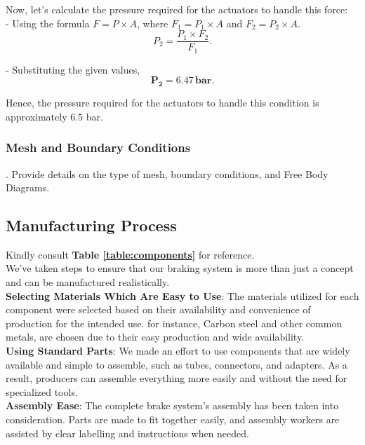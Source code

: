 Now, let's calculate the pressure required for the actuators to handle this force: \\
 
- Using the formula $F = P \times A$, where $F_1 = P_1 \times A$ and $F_2 = P_2 \times A$.\\  
\[
P_2 = \frac{P_1 \times F_2}{F_1}.
\]  

- Substituting the given values, 
\begin{equation}
\mathbf{P_2} = \mathbf{6.47} \, \textbf{bar}.
\end{equation}

Hence, the pressure required for the actuators to handle this condition is approximately $6.5$ bar.
\subsubsection{Mesh and Boundary Conditions}
.  Provide details on the type of mesh, boundary conditions, and Free Body Diagrams.


\subsection{Manufacturing Process}
Kindly consult \textbf{Table \ref{table:components}} for reference.\\

\noindent
We've taken steps to ensure that our braking system is more than just a concept and can be manufactured realistically.\\

\noindent
\textbf{Selecting Materials Which Are Easy to Use}: The materials utilized for each component were selected based on their availability and convenience of production for the intended use. for instance, Carbon steel and other common metals, are chosen due to their easy production and wide availability.\\

\noindent
\textbf{Using Standard Parts}: We made an effort to use components that are widely available and simple to assemble, such as tubes, connectors, and adapters. As a result, producers can assemble everything more easily and without the need for specialized tools.\\ 

\noindent
\textbf{Assembly Ease}: The complete brake system's assembly has been taken into consideration. Parts are made to fit together easily, and assembly workers are assisted by clear labelling and instructions when needed.



